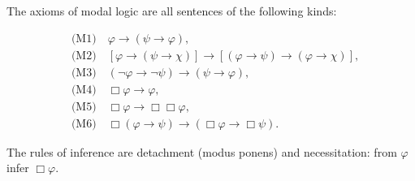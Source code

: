 The axioms of modal logic are all sentences of the following kinds:

\begin{align}
&\text{(M1)}\quad \varphi \rightarrow (\psi \rightarrow \varphi),\\
&\text{(M2)}\quad [\varphi \rightarrow (\psi \rightarrow \chi)] \rightarrow [(\varphi \rightarrow \psi) \rightarrow (\varphi \rightarrow \chi)],\\
&\text{(M3)}\quad (\neg \varphi \rightarrow \neg \psi) \rightarrow (\psi \rightarrow \varphi),\\
&\text{(M4)}\quad \Box \varphi \rightarrow \varphi,\\
&\text{(M5)}\quad \Box \varphi \rightarrow \Box \Box \varphi,\\
&\text{(M6)}\quad \Box (\varphi \rightarrow \psi) \rightarrow (\Box \varphi \rightarrow \Box \psi).
\end{align}

The rules of inference are detachment (modus ponens) and necessitation: from $\varphi$ infer $\Box \varphi$.
